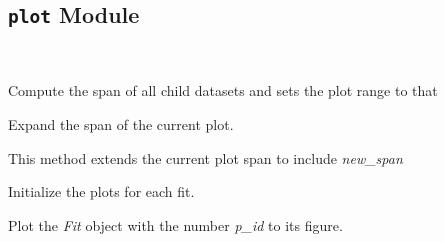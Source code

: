 \documentclass[letterpaper,10pt,english]{sphinxmanual}
\begin{document}
\subsection{\texttt{plot} Module}
\label{api/kafe:module-kafe.plot}\label{api/kafe:plot-module}\label{api/kafe:module-plot}

\begin{fulllineitems}
\label{api/kafe:kafe.plot.Plot}~

\begin{fulllineitems}
\label{api/kafe:kafe.plot.Plot.compute_plot_range}
Compute the span of all child datasets and sets the plot range to that

\end{fulllineitems}


\begin{fulllineitems}
\label{api/kafe:kafe.plot.Plot.extend_span}
Expand the span of the current plot.

This method extends the current plot span to include \emph{new\_span}

\end{fulllineitems}


\begin{fulllineitems}
\label{api/kafe:kafe.plot.Plot.init_plots}
Initialize the plots for each fit.

\end{fulllineitems}


\begin{fulllineitems}
\label{api/kafe:kafe.plot.Plot.plot}
Plot the \emph{Fit} object with the number \emph{p\_id} to its figure.

\end{fulllineitems}


\end{fulllineitems}
\end{document}
